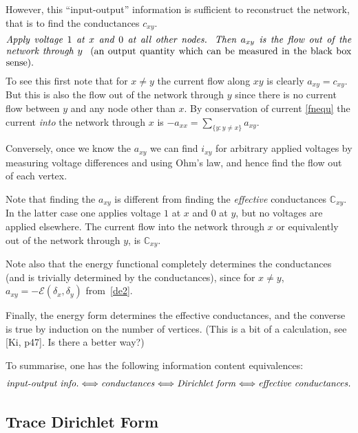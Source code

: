 \documentclass[a4paper]{amsart}
\theoremstyle{plain}
\theoremstyle{definition}
\theoremstyle{remark}
\begin{document}
 However, this ``input-output'' information  is  sufficient to reconstruct the network, that is to find the conductances $ c_{xy} $.   
 \begin{equation} \label{}
 \parbox{5in} {\emph{Apply voltage $ 1 $ at $ x $ and $ 0 $ at  all other nodes.  Then $ a_{xy} $ is the flow out of the network through $ y $ } (an output quantity which can be measured in the black box sense).}   
\end{equation} 
 To see this first note that   for $ x \neq y $ the current flow along $ x  y $ is clearly $a_{xy} = c_{xy} $. But this is also the flow out of the network through $ y $ since there is no current flow  between $ y $ and any node other than $ x $. By conservation of current \eqref{fnequ} the current \emph{into} the network through $ x $ is  $ -a_{xx} = \sum_{\{y: y \neq x \}} a_{xy} $.
 
  Conversely, once we know the $ a_{xy} $ we can find $ i_{xy} $ for arbitrary applied voltages by measuring voltage differences and using Ohm's law, and hence find the flow out of each vertex. 


Note that finding the $ a_{xy} $  is different from finding the \emph{effective} conductances $ \mathbb{C}_{xy}$.  In the latter case one applies voltage $ 1 $ at $ x $ and $ 0 $ at $ y $, but no voltages are applied elsewhere.  The current flow  into the network through $ x $ or equivalently out of the network through $ y $, is $ \mathbb{C}_{xy} $.  


\medskip
  Note also that the energy functional completely determines the conductances (and is trivially determined by the conductances), since for $ x \neq y $, $ a_{xy} = -\mathcal{E}(\delta_x, \delta_y) $ from~\eqref{de2}.
  
 \medskip  Finally, the energy form determines the effective conductances, and the converse is true by induction on the number of vertices. (This is a bit of a calculation, see [Ki, p47].  Is there a better way?)

\medskip
 To summarise, one has the following information content equivalences:
\begin{equation} \label{}
\text{\emph{input-output info.}} \Longleftrightarrow  \text{\emph{conductances}} 
\Longleftrightarrow  \text{\emph{Dirichlet form}}  \Longleftrightarrow  \text{\emph{effective conductances}}.
\end{equation} 


\subsection{Trace Dirichlet Form} \label{sectdf}
\end{document}
